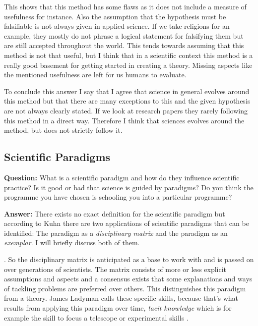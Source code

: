 \documentclass[11pt]{scrartcl}
\begin{document}
This shows that this method has some flaws as it does not include a measure of usefulness for instance. Also the assumption that the hypothesis must be falsifiable is not always given in applied science. If we take religions for an example, they mostly do not phrase a logical statement for falsifying them but are still accepted throughout the world. This tends towards assuming that  this method is not that useful, but I think that in a scientific context this method is a really good basement for getting started in creating a theory. Missing aspects like the mentioned usefulness are left for us humans to evaluate.

To conclude this answer I say that I agree that science in general evolves around this method but that there are many exceptions to this and the given hypothesis are not always clearly stated. If we look at research papers they rarely following this method in a direct way. Therefore I think that sciences evolves around the method, but does not strictly follow it.

\subsection{Scientific Paradigms}

\textbf{Question:} What is a scientific paradigm and how do they influence scientific practice? Is it good or bad that science is guided by paradigms? Do you think the programme you have chosen is schooling you into a particular programme?

\bigbreak

\textbf{Answer:} There exists no exact definition for the scientific paradigm but according to Kuhn there are two applications of scientific paradigms that can be identified: The paradigm as a \textit{disciplinary matrix} and the paradigm as an \textit{exemplar}. I will briefly discuss both of them.

 \cite[p. 98]{ladyman}. So the disciplinary matrix is anticipated as a base to work with and is passed on over generations of scientists. The matrix consists of more or less explicit assumptions and aspects and a consensus exists that some explanations and ways of tackling problems are preferred over others. This distinguishes this paradigm from a theory. James Ladyman calls these specific skills, because that's what results from applying this paradigm over time, \textit{tacit knowledge} which is for example the skill to focus a telescope or experimental skills \cite[p. 99]{ladyman}.
\end{document}
